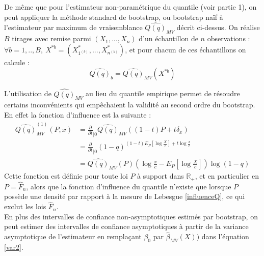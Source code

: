 \documentclass{article}
\renewcommand*{\(}{ \left( }
\renewcommand*{\)}{ \right) }
\begin{document}
De même que pour l'estimateur non-paramétrique du quantile (voir partie 1), on peut appliquer la méthode standard  de bootstrap, ou bootstrap naïf à l'estimateur par maximum de vraisemblance $\widehat{Q(q)}_{MV}$ décrit ci-dessus. On réalise $B$ tirages avec remise parmi $(X_1, ..., X_n)$ d'un échantillon de $n$ observations : $\forall b = 1,..,B, \ X^{*b} = (X^*_{1^{(b)}}, ..., X^*_{n^{(b)}})$, et pour chacun de ces échantillons on calcule :
\[ \widehat{Q(q)}_b = \widehat{Q(q)}_{MV}(X^{*b}) \]

L'utilisation de $\widehat{Q(q)}_{MV}$ au lieu du quantile empirique  permet de résoudre certains inconvénients qui empêchaient la validité au second ordre du bootstrap. En effet la fonction d'influence est la suivante :
\begin{align*}
\widehat{Q(q)}_{MV}^{(1)}(P,x) &= \frac{\partial}{\partial t}_{|0} \widehat{Q(q)}_{MV}((1-t)P + t\delta_x) \\ 
&= \frac{\partial}{\partial t}_{|0} (1-q)^{(1-t)E_{P}[\log \frac{X}{c}] + t\log \frac{x}{c}} \\ 
&= \widehat{Q(q)}_{MV}(P) \left( \log\frac{x}{c} - E_{P}\left[\log \frac{X}{c}\right] \right) \log(1-q)
\end{align*}
Cette fonction est définie pour toute loi $P$ à support dans $\mathbb{R}_+$, et en particulier en $P = \hat{F}_n$, alors que la fonction d'influence du quantile n'existe que lorsque $P$ possède une densité par rapport à la mesure de Lebesgue \eqref{influenceQ}, ce qui exclut les lois $\hat{F}_n$. \\ 
En plus des intervalles de confiance non-asymptotiques estimés par bootstrap, on peut estimer des intervalles de confiance asymptotiques à partir de la variance asymptotique de l'estimateur en remplaçant $\beta_0$ par $\widehat{\beta}_{MV}(X))$ dans l'équation \eqref{var2}.

\end{document}
